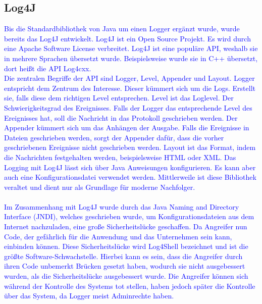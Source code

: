 \subsection{Log4J}\label{subsec:log4j}
\textcolor{blue}{
    Bis die Standardbibliothek von Java um einen Logger ergänzt wurde, wurde bereits das Log4J entwickelt.
    Log4J ist ein Open Source Projekt.
    Es wird durch eine Apache Software License verbreitet.
    Log4J ist eine populäre API, weshalb sie in mehrere Sprachen übersetzt wurde.
    Beispielsweise wurde sie in C++ übersetzt, dort heißt die API Log4cxx.
    \\
    Die zentralen Begriffe der API sind Logger, Level, Appender und Layout.
    Logger entspricht dem Zentrum des Interesse.
    Dieser kümmert sich um die Logs.
    Erstellt sie, falls diese dem richtigen Level entsprechen.
    Level ist das Loglevel.
    Der Schwierigkeitsgrad des Ereignisses.
    Falls der Logger das entsprechende Level des Ereignisses hat, soll die Nachricht in das Protokoll geschrieben werden.
    Der Appender kümmert sich um das Anhängen der Ausgabe.
    Falls die Ereignisse in Dateien geschrieben werden, sorgt der Appender dafür, dass die vorher geschriebenen Ereignisse nicht geschrieben werden.
    Layout ist das Format, indem die Nachrichten festgehalten werden, beispielsweise HTML oder XML.
    Das Logging mit Log4J lässt sich über Java Anweisungen konfigurieren.
    Es kann aber auch eine Konfigurationsdatei verwendet werden.
    Mittlerweile ist diese Bibliothek veraltet und dient nur als Grundlage für moderne Nachfolger.
\\
\\
Im Zusammenhang mit Log4J wurde durch das Java Naming and Directory Interface (JNDI), welches geschrieben wurde, um Konfigurationsdateien aus dem Internet nachzuladen, eine große Sicherheitslücke geschaffen.
Da Angreifer nun Code, der gefährlich für die Anwendung und das Unternehmen sein kann, einbinden können.
Diese Sicherheitslücke wird Log4Shell bezeichnet und ist die größte Software-Schwachstelle.
Hierbei kann es sein, dass die Angreifer durch ihren Code unbemerkt Brücken gesetzt haben, wodurch sie nicht ausgebessert wurden, als die Sicherheitslücke ausgebessert wurde.
Die Angreifer können sich während der Kontrolle des Systems tot stellen, haben jedoch später die Kontrolle über das System, da Logger meist Adminrechte haben.}\autocite{baeldung, rheinwerk}

